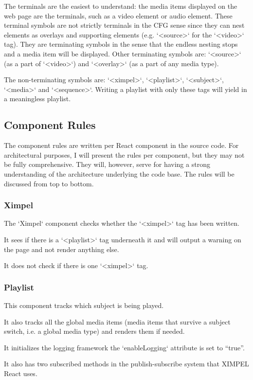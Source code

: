 The terminals are the easiest to understand: the media items displayed on the web page are the terminals, such as a video element or audio element. These terminal symbols are not strictly terminals in the CFG sense since they can nest elements as overlays and supporting elements (e.g. `<source>` for the `<video>` tag). They are terminating symbols in the sense that the endless nesting stops and a media item will be displayed. Other terminating symbols are: `<source>` (as a part of `<video>`) and `<overlay>` (as a part of any media type).

The non-terminating symbols are: `<ximpel>`, `<playlist>`, `<subject>`, `<media>` and `<sequence>`. Writing a playlist with only these tags will yield in a meaningless playlist.

\subsection{Component Rules}
The component rules are written per React component in the source code. For architectural purposes, I will present the rules per component, but they may not be fully comprehensive. They will, however, serve for having a strong understanding of the architecture underlying the code base. The rules will be discussed from top to bottom. 

\subsubsection{Ximpel}
The `Ximpel` component checks whether the `<ximpel>` tag has been written. 

It sees if there is a `<playlist>` tag underneath it and will output a warning on the page and not render anything else. 

It does not check if there is one `<ximpel>` tag. 

\subsubsection{Playlist}
This component tracks which subject is being played. 

It also tracks all the global media items (media items that survive a subject switch, i.e. a global media type) and renders them if needed. 

It initializes the logging framework the `enableLogging` attribute is set to ``true''. 

It also has two subscribed methods in the publish-subscribe system that XIMPEL React uses. 

